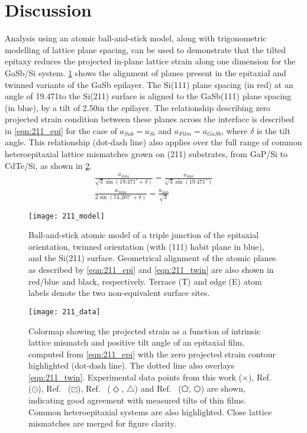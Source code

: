 \section{Discussion}
Analysis using an atomic ball-and-stick model, along with trigonometric modelling of lattice plane spacing, can be used to demonstrate that the tilted epitaxy reduces the projected in-plane lattice strain along one dimension for the GaSb/Si system. \cref{fig:211_model} shows the alignment of planes present in the epitaxial and twinned variants of the GaSb epilayer. The Si(111) plane spacing (in red) at an angle of 19.471\degree to the Si(211) surface is aligned to the GaSb(111) plane spacing (in blue), by a tilt of 2.50\degree in the epilayer. The relationship describing zero projected strain condition between these planes across the interface is described in \cref{eqn:211_epi} for the case of $a_{Sub} = a_{Si}$ and $a_{Film} = a_{GaSb}$, where $\delta$ is the tilt angle. This relationship (dot-dash line) also applies over the full range of common heteroepitaxial lattice mismatches grown on (211) substrates, from GaP/Si to CdTe/Si, as shown in \cref{fig:211_data}.
\begin{gather} 
 \frac{ a_{film}}{\sqrt{3} \sin(19.471^\circ + \delta)} = \frac{a_{Sub}}{\sqrt{3}\sin(19.471^\circ)} \label{eqn:211_epi}\\
 \frac{ a_{film}}{2\sin(74.207^\circ + \delta)} = \frac{ a_{Sub}}{\sqrt{3}}   \label{eqn:211_twin}
\end{gather}
\begin{figure}
    \centering
\texttt{[image: 211\_model]}
\caption[Atomic model of tilted thin film on 211 silicon]{\label{fig:211_model}Ball-and-stick atomic model of a triple junction of the epitaxial orientation, twinned orientation (with (111) habit plane in blue), and the Si(211) surface. Geometrical alignment of the atomic planes as described by \cref{eqn:211_epi} and \cref{eqn:211_twin} are also shown in red/blue and black, respectively. Terrace (T) and edge (E) atom labels denote the two non-equivalent surface sites.}
\end{figure}
\begin{figure}
    \centering
\texttt{[image: 211\_data]}
\caption[Colourmap of tilt and intrinsic lattice ismatch of thin films on 211 substrates]{\label{fig:211_data}Colormap showing the projected strain as a function of 
intrinsic lattice mismatch and positive tilt angle of an epitaxial film, computed from 
\cref{eqn:211_epi} with the zero projected strain contour highlighted (dot-dash 
line). The dotted line also overlays \cref{eqn:211_twin}. Experimental data points 
from this work ($\times$), Ref.~ ($\odot$), Ref.~ 
($\boxdot$), Ref.~ ($\Diamond$, $\bigtriangleup$) and 
Ref.~ ($\pentagon$, $\varhexagon$) are shown, 
indicating good agreement with measured tilts of thin films. Common heteroepitaxial 
systems are also highlighted. Close lattice mismatches are merged for figure clarity.}
\end{figure}
